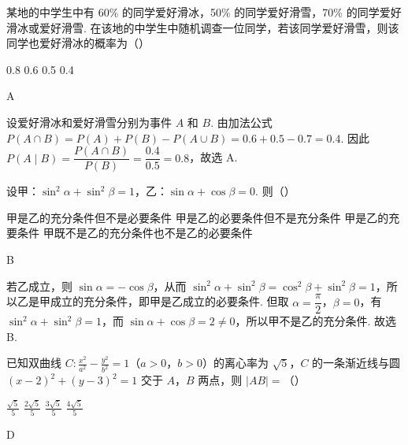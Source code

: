 \begin{problem}
某地的中学生中有 60\% 的同学爱好滑冰，50\% 的同学爱好滑雪，70\% 的同学爱好滑冰或爱好滑雪. 在该地的中学生中随机调查一位同学，若该同学爱好滑雪，则该同学也爱好滑冰的概率为（\quad）

\choices
    {0.8}
    {0.6}
    {0.5}
    {0.4}
\end{problem}

\begin{answer}
A
\end{answer}

\begin{solution}
设爱好滑冰和爱好滑雪分别为事件 \(A\) 和 \(B\). 由加法公式
\(P(A\cap B)=P(A)+P(B)-P(A\cup B)=0.6+0.5-0.7=0.4\). 因此
\(P(A\mid B)=\dfrac{P(A\cap B)}{P(B)}=\dfrac{0.4}{0.5}=0.8\)，故选 A.
\end{solution}

\begin{problem}
设甲：\( \sin^2\alpha+\sin^2\beta=1 \)，乙：\( \sin\alpha+\cos\beta=0 \). 则（\quad）

\choices
    {甲是乙的充分条件但不是必要条件}
    {甲是乙的必要条件但不是充分条件}
    {甲是乙的充要条件}
    {甲既不是乙的充分条件也不是乙的必要条件}
\end{problem}

\begin{answer}
B
\end{answer}

\begin{solution}
若乙成立，则 \(\sin\alpha=-\cos\beta\)，从而
\(\sin^2\alpha+\sin^2\beta=\cos^2\beta+\sin^2\beta=1\)，所以乙是甲成立的充分条件，即甲是乙成立的必要条件. 但取
\(\alpha=\dfrac{\pi}{2}\)，\(\beta=0\)，有 \(\sin^2\alpha+\sin^2\beta=1\)，而
\(\sin\alpha+\cos\beta=2\ne0\)，所以甲不是乙的充分条件. 故选 B.
\end{solution}

\begin{problem}
已知双曲线 \( C:\frac{x^2}{a^2}-\frac{y^2}{b^2}=1 \)（\(a>0\)，\(b>0\)）的离心率为 \( \sqrt{5} \)，\(C\) 的一条渐近线与圆 \( \left( x-2 \right)^2+\left( y-3 \right)^2=1 \) 交于 \(A\)，\(B\) 两点，则 \( \lvert AB \rvert= \)（\quad）

\choices
    {\(\frac{\sqrt{5}}{5}\)}
    {\(\frac{2\sqrt{5}}{5}\)}
    {\(\frac{3\sqrt{5}}{5}\)}
    {\(\frac{4\sqrt{5}}{5}\)}
\end{problem}

\begin{answer}
D
\end{answer}

